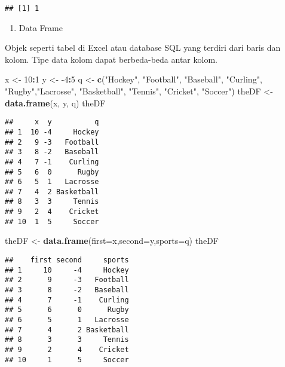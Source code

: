 \documentclass[
]{book}
\newenvironment{Shaded}{\begin{snugshade}}{\end{snugshade}}
\newcommand{\DataTypeTok}[1]{\textcolor[rgb]{0.13,0.29,0.53}{#1}}
\newcommand{\DecValTok}[1]{\textcolor[rgb]{0.00,0.00,0.81}{#1}}
\newcommand{\KeywordTok}[1]{\textcolor[rgb]{0.13,0.29,0.53}{\textbf{#1}}}
\newcommand{\NormalTok}[1]{#1}
\newcommand{\OperatorTok}[1]{\textcolor[rgb]{0.81,0.36,0.00}{\textbf{#1}}}
\newcommand{\StringTok}[1]{\textcolor[rgb]{0.31,0.60,0.02}{#1}}
\providecommand{\tightlist}{%
  \setlength{\itemsep}{0pt}\setlength{\parskip}{0pt}}
\begin{document}
\begin{verbatim}
## [1] 1
\end{verbatim}

\begin{enumerate}
\def\labelenumi{\arabic{enumi}.}
\setcounter{enumi}{4}
\tightlist
\item
  Data Frame
\end{enumerate}

Objek seperti tabel di Excel atau database SQL yang terdiri dari baris dan kolom. Tipe data kolom dapat berbeda-beda antar kolom.

\begin{Shaded}
\begin{Highlighting}[]
\NormalTok{x \textless{}{-}}\StringTok{ }\DecValTok{10}\OperatorTok{:}\DecValTok{1}
\NormalTok{y \textless{}{-}}\StringTok{ }\DecValTok{{-}4}\OperatorTok{:}\DecValTok{5}
\NormalTok{q \textless{}{-}}\StringTok{ }\KeywordTok{c}\NormalTok{(}\StringTok{"Hockey"}\NormalTok{, }\StringTok{"Football"}\NormalTok{, }\StringTok{"Baseball"}\NormalTok{, }\StringTok{"Curling"}\NormalTok{, }\StringTok{"Rugby"}\NormalTok{,}\StringTok{"Lacrosse"}\NormalTok{, }\StringTok{"Basketball"}\NormalTok{, }\StringTok{"Tennis"}\NormalTok{, }\StringTok{"Cricket"}\NormalTok{, }\StringTok{"Soccer"}\NormalTok{)}
\NormalTok{theDF \textless{}{-}}\StringTok{ }\KeywordTok{data.frame}\NormalTok{(x, y, q)}
\NormalTok{theDF}
\end{Highlighting}
\end{Shaded}

\begin{verbatim}
##     x  y          q
## 1  10 -4     Hockey
## 2   9 -3   Football
## 3   8 -2   Baseball
## 4   7 -1    Curling
## 5   6  0      Rugby
## 6   5  1   Lacrosse
## 7   4  2 Basketball
## 8   3  3     Tennis
## 9   2  4    Cricket
## 10  1  5     Soccer
\end{verbatim}

\begin{Shaded}
\begin{Highlighting}[]
\NormalTok{theDF \textless{}{-}}\StringTok{ }\KeywordTok{data.frame}\NormalTok{(}\DataTypeTok{first=}\NormalTok{x,}\DataTypeTok{second=}\NormalTok{y,}\DataTypeTok{sports=}\NormalTok{q)}
\NormalTok{theDF}
\end{Highlighting}
\end{Shaded}

\begin{verbatim}
##    first second     sports
## 1     10     -4     Hockey
## 2      9     -3   Football
## 3      8     -2   Baseball
## 4      7     -1    Curling
## 5      6      0      Rugby
## 6      5      1   Lacrosse
## 7      4      2 Basketball
## 8      3      3     Tennis
## 9      2      4    Cricket
## 10     1      5     Soccer
\end{verbatim}
\end{document}
